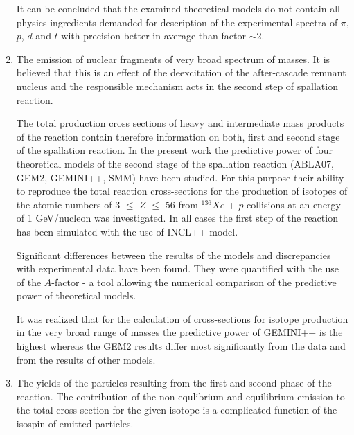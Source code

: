 \begin{enumerate}
It can be concluded that the examined theoretical models do not
contain all physics ingredients demanded for description of the
experimental spectra of $\pi$, $p$, $d$ and $t$ with precision
better in average than factor $\sim$2.

\item The emission of nuclear fragments of very broad spectrum of masses. It is believed that this is an effect of
the deexcitation of the after-cascade remnant nucleus and the
responsible mechanism acts in the second step of spallation
reaction.

\vspace{0.3cm}

The total production cross
sections of heavy and intermediate mass products of the reaction
contain therefore information on both, first and second stage of the
spallation reaction.  In the present work the predictive power of
four theoretical models of the second stage of the spallation
reaction (ABLA07, GEM2, GEMINI++, SMM) have been studied. For this
purpose their ability to reproduce the total reaction cross-sections
for the production of isotopes of the atomic numbers of 3 $\leq$ $Z$
$\leq$ 56 from  $^{136}Xe$ + $p$ collisions at an energy of 1
GeV/nucleon \cite{napolitani2007measurement} was investigated. In all cases the
first step of the reaction has been simulated with the use of INCL++
model.

Significant differences between the results of the models and
discrepancies with experimental data have been found. %
They were quantified with the use of the
$A$-factor - a tool allowing the numerical comparison of the
predictive power of theoretical models.

It was realized that for the calculation of cross-sections for
isotope production in the very broad range of masses the predictive
power of GEMINI++ is the highest whereas the GEM2 results differ
most significantly from the data and from the results of other
models.

\item The yields of the particles resulting from the first and second phase of the reaction. The contribution of the
non-equlibrium and equilibrium emission to the total cross-section
for the given isotope
is a complicated function of the isospin of emitted particles.


\end{enumerate}
